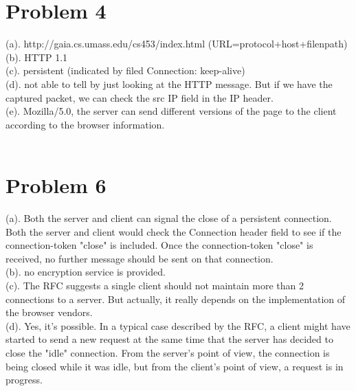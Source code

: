 \documentclass[titlepage, paper=a4, fontsize=11pt]{scrartcl} %
\numberwithin{equation}{section} %
\numberwithin{figure}{section} %
\numberwithin{table}{section} %
\begin{document}
\section*{Problem 4}
(a). http://gaia.cs.umass.edu/cs453/index.html  (URL=protocol+host+filenpath) \\

(b). HTTP 1.1 \\

(c). persistent (indicated by filed Connection: keep-alive) \\

(d). not able to tell by just looking at the HTTP message. But if we have the captured packet, we can check the src IP field in the IP header. \\

(e). Mozilla/5.0, the server can send different versions of the page to the client according to the browser information. \\
\\



\section*{Problem 6}
(a). Both the server and client can signal the close of a persistent connection. Both the server and client
would check the Connection header field to see if the connection-token "close" is included. Once the
connection-token "close" is received, no further message should be sent on that connection. \\

(b). no encryption service is provided. \\

(c). The RFC suggests a single client should not maintain more than 2 connections to a server. But actually,
it really depends on the implementation of the browser vendors. \\

(d). Yes, it's possible. In a typical case described by the RFC, a client might have started to send a new request
at the same time that the server has decided to close the "idle" connection. From the server's point of view,
the connection is being closed while it was idle, but from the client's point of view, a request is in progress.\\
\\
\end{document}
